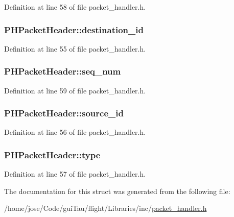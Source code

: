 Definition at line 58 of file packet\-\_\-handler.\-h.

\hypertarget{struct_p_h_packet_header_a19915477b7c7c9c24b293ba4db7c6426}{
\subsubsection[{destination\-\_\-id}]{ P\-H\-Packet\-Header\-::destination\-\_\-id}}\label{struct_p_h_packet_header_a19915477b7c7c9c24b293ba4db7c6426}


Definition at line 55 of file packet\-\_\-handler.\-h.

\hypertarget{struct_p_h_packet_header_a3d0a8a439dadc33b716f7e926a9546cf}{
\subsubsection[{seq\-\_\-num}]{ P\-H\-Packet\-Header\-::seq\-\_\-num}}\label{struct_p_h_packet_header_a3d0a8a439dadc33b716f7e926a9546cf}


Definition at line 59 of file packet\-\_\-handler.\-h.

\hypertarget{struct_p_h_packet_header_a93bf1fc396b4d98f870fee75682423b7}{
\subsubsection[{source\-\_\-id}]{ P\-H\-Packet\-Header\-::source\-\_\-id}}\label{struct_p_h_packet_header_a93bf1fc396b4d98f870fee75682423b7}


Definition at line 56 of file packet\-\_\-handler.\-h.

\hypertarget{struct_p_h_packet_header_ad816b782c8c40b9e03bdf092fd37bb3c}{
\subsubsection[{type}]{ P\-H\-Packet\-Header\-::type}}\label{struct_p_h_packet_header_ad816b782c8c40b9e03bdf092fd37bb3c}


Definition at line 57 of file packet\-\_\-handler.\-h.



The documentation for this struct was generated from the following file\-:\begin{DoxyCompactItemize}
\item 
/home/jose/\-Code/gui\-Tau/flight/\-Libraries/inc/\hyperlink{packet__handler_8h}{packet\-\_\-handler.\-h}\end{DoxyCompactItemize}
